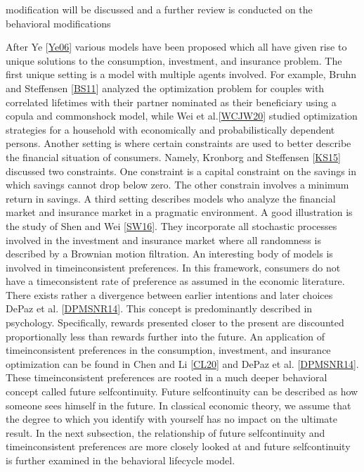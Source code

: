 \documentclass[letterpaper,10pt,english]{jupyterBook}
\begin{document}
modification will be discussed and a further review is conducted on the behavioral modifications

\sphinxAtStartPar
After Ye {[}\hyperlink{cite.Financial_application:id24}{Ye06}{]} various models have been proposed which all have given rise to unique solutions to the consumption, investment, and insurance problem. The first unique setting is a model with multiple agents involved. For example,  Bruhn and Steffensen {[}\hyperlink{cite.Financial_application:id30}{BS11}{]} analyzed the optimization problem for couples with correlated lifetimes with their partner nominated as their beneficiary using a copula and common\sphinxhyphen{}shock model, while Wei et al.{[}\hyperlink{cite.Financial_application:id33}{WCJW20}{]} studied optimization strategies for a household with economically and probabilistically dependent persons. Another setting is where certain constraints are used to better describe the financial situation of consumers. Namely, Kronborg and Steffensen {[}\hyperlink{cite.Financial_application:id32}{KS15}{]} discussed two constraints. One constraint is a capital constraint on the savings in which savings cannot drop below zero. The other constrain involves a minimum return in savings. A third setting describes models who analyze the financial market and insurance market in a pragmatic environment. A good illustration is the study of Shen and Wei {[}\hyperlink{cite.Financial_application:id34}{SW16}{]}. They incorporate all stochastic processes involved in the investment and insurance market where all randomness is described by a Brownian motion filtration. An interesting body of models is involved in time\sphinxhyphen{}inconsistent preferences. In this framework, consumers do not have a time\sphinxhyphen{}consistent rate of preference as assumed in the economic literature. There exists rather a divergence between earlier intentions and later choices De\sphinxhyphen{}Paz et al. {[}\hyperlink{cite.Financial_application:id37}{DPMSNR14}{]}. This concept is predominantly described in psychology. Specifically, rewards presented closer to the present are discounted proportionally less than rewards further into the future. An application of time\sphinxhyphen{}inconsistent preferences in the consumption, investment, and insurance optimization can be found in Chen and Li {[}\hyperlink{cite.Financial_application:id36}{CL20}{]} and De\sphinxhyphen{}Paz et al. {[}\hyperlink{cite.Financial_application:id37}{DPMSNR14}{]}. These time\sphinxhyphen{}inconsistent preferences are rooted in a much deeper behavioral concept called future self\sphinxhyphen{}continuity. Future self\sphinxhyphen{}continuity can be described as how someone sees himself in the future. In classical economic theory, we assume that the degree to which you identify with yourself has no impact on the ultimate result. In the next subsection, the relationship of future self\sphinxhyphen{}continuity and time\sphinxhyphen{}inconsistent preferences are more closely looked at and future self\sphinxhyphen{}continuity is further examined in the behavioral life\sphinxhyphen{}cycle model.
\end{document}

